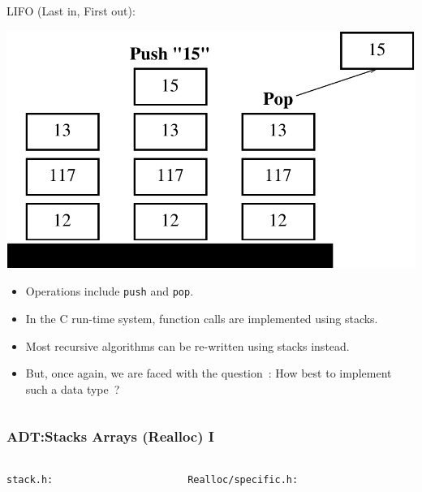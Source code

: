 \begin{frame}[fragile]
\begin{columns}[T]
\pause
\begin{column}{0.45\textwidth}
LIFO (Last in, First out):
\begin{center}
\includegraphics[scale=0.25]{../Images/pdstack.pdf}
\end{center}
\begin{itemize}[<+->]
\item Operations include \verb^push^ and \verb^pop^.
\item In the C run-time system, function calls are implemented using stacks.
\item Most recursive algorithms can be re-written using stacks instead.
\item But, once again, we are faced with the question~: How best to implement such a data type~?
\end{itemize}
\end{column}

\end{columns}
\end{frame}


\begin{frame}[fragile]
\frametitle{ADT:Stacks Arrays (Realloc) I}
\begin{columns}[T]

\begin{column}{0.45\textwidth}
\verb^stack.h:^

\end{column}

\pause
\begin{column}{0.45\textwidth}
\verb^Realloc/specific.h:^

\end{column}

\end{columns}
\end{frame}

